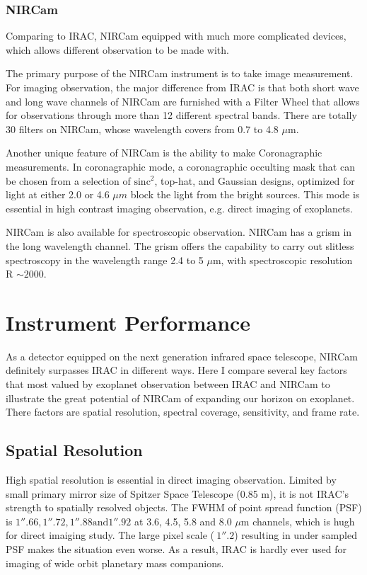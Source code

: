 \documentclass[preprint, 12pt]{aastex}
\begin{document}
\subsubsection{NIRCam}
Comparing to IRAC, NIRCam equipped with much more complicated devices,
which allows different observation to be made with.

The primary purpose of the NIRCam instrument is to take image
measurement. For imaging observation, the major difference from IRAC
is that both short wave and long wave channels of NIRCam are furnished
with a Filter Wheel that allows for observations through more than 12
different spectral bands. There are totally 30 filters on NIRCam,
whose wavelength covers from 0.7 to 4.8 $\mu$m. 

Another unique feature of NIRCam is the ability to make Coronagraphic
measurements. In coronagraphic mode, a coronagraphic occulting mask
that can be chosen from a selection of $\mathrm{sinc}^{2}$, top-hat, and Gaussian
designs, optimized for light at either 2.0 or 4.6 $\mu m$ block the
light from the bright sources. This mode is essential in high contrast
imaging observation, e.g. direct imaging of exoplanets.

NIRCam is also available for spectroscopic observation. NIRCam has a
grism in the long wavelength channel. The grism offers the capability to
carry out slitless spectroscopy in the wavelength range 2.4 to 5 $\mu$m,
with spectroscopic resolution R $\sim 2000$.


\section{Instrument Performance}
\label{sec:performance}
As a detector equipped on the next generation infrared space
telescope, NIRCam definitely surpasses IRAC in different ways. Here I
compare several key factors that most valued by exoplanet observation
between IRAC and NIRCam to illustrate the great potential of NIRCam of
expanding our horizon on exoplanet. There factors are spatial
resolution, spectral coverage, sensitivity, and frame
rate.\par

\subsection{Spatial Resolution}
High spatial resolution is essential in direct imaging
observation. Limited by small primary mirror size of Spitzer Space
Telescope (0.85 m), it is not IRAC's strength to spatially resolved
objects. The FWHM of point spread function (PSF) is $1''.66, 1''.72,
1''.88 \mbox{and} 1''.92$ at 3.6, 4.5, 5.8 and 8.0 $\mu$m channels,
which is hugh for direct imaiging study. The large pixel scale
($~1''.2$) resulting in under sampled PSF makes the situation even
worse. As a result, IRAC is hardly ever used for imaging of wide
orbit planetary mass companions.\par
\end{document}
